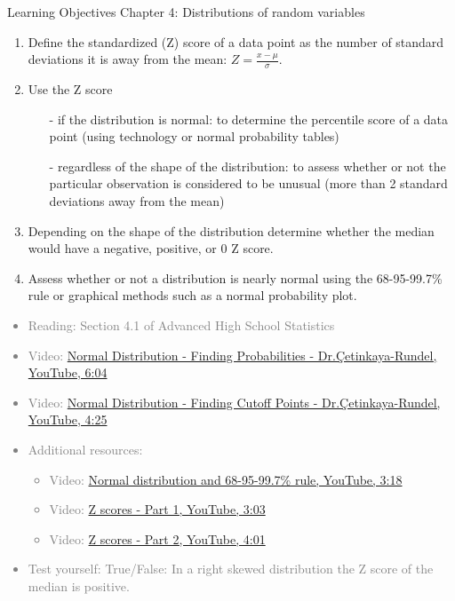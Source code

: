 \documentclass[11pt]{article}
\newcommand{\gray}[1]{\textcolor{gray}{#1}}
\begin{document}
{\LARGE \textcolor{oiB}{Learning Objectives \hfill Chapter 4: Distributions of random variables}} \\

\begin{enumerate}
\renewcommand\labelenumi{\textcolor{oiB}{\textbf{LO \theenumi.}}}

\item Define the standardized (Z) score of a data point as the number of standard deviations it is away from the mean: $Z = \frac{x - \mu}{\sigma}$.

\item Use the Z score 
\begin{itemize}
\item[-] if the distribution is normal: to determine the percentile score of a data point (using technology or normal probability tables)
\item[-] regardless of the shape of the distribution: to assess whether or not the particular observation is considered to be unusual (more than 2 standard deviations away from the mean) 
\end{itemize}

\item Depending on the shape of the distribution determine whether the median would have a negative, positive, or 0 Z score.

\item Assess whether or not a distribution is nearly normal using the 68-95-99.7\% rule or graphical methods such as a normal probability plot.

\end{enumerate}

\gray{
{\it
\vspace{-0.75cm}
\begin{itemize}
\renewcommand{\labelitemi}{{\textcolor{oiB}{$\ast$}}}
\item Reading: Section 4.1 of Advanced High School Statistics
\item Video: \href{http://www.youtube.com/watch?v=ev463hHe544}{Normal Distribution - Finding Probabilities - Dr.\c{C}etinkaya-Rundel, YouTube, 6:04}
\item Video: \href{http://www.youtube.com/watch?v=6rAg4Y6NirU}{Normal Distribution - Finding Cutoff Points - Dr.\c{C}etinkaya-Rundel, YouTube, 4:25}
\item Additional resources:
\begin{itemize}
\item Video: \href{http://www.youtube.com/watch?v=McSFVzc8Swk&list=PL568547ACA9211CCA&index=24}{Normal distribution and 68-95-99.7\% rule, YouTube, 3:18}
\item Video: \href{http://www.youtube.com/watch?v=5v3Czc6ZK-Q&list=PL568547ACA9211CCA&index=23}{Z scores - Part 1, YouTube, 3:03} 
\item Video: \href{http://www.youtube.com/watch?v=aa_deKPDgI4&list=PL568547ACA9211CCA&index=22}{Z scores - Part 2, YouTube, 4:01}
\end{itemize}
\item Test yourself: True/False: In a right skewed distribution the Z score of the median is positive.
\end{itemize}
}}
\end{document}
